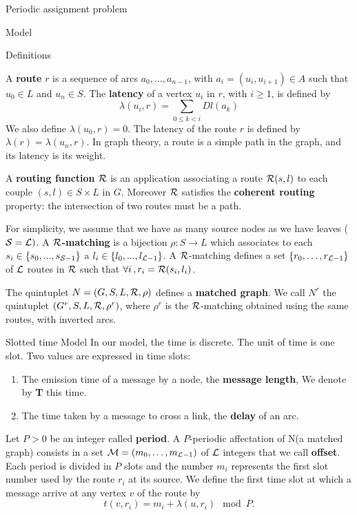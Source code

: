 \documentclass[a4paper,10pt]{report}
\newcommand\rmatching{${\cal R}$-matching\xspace}
\newcommand\matchedgraph{{\bf matched graph}}
\begin{document}
\begin{chapter}{Periodic assignment problem}
\begin{section}{Model}
\begin{subsection}{Definitions}
\begin{center}
{{}}\end{center}

A {\bf route} $r$ is a sequence of arcs $a_0, \ldots , a_{n-1}$, with $a_i=(u_i,u_{i+1}) \in A$ such that $u_0 \in L$ and $u_n \in S$.
The {\bf latency} of a vertex $u_i$ in $r$, with $i \geq 1$, is defined by $$\lambda(u_i,r)= \sum\limits_{0 \leq k <i} Dl(a_k)$$ We also define $\lambda(u_0,r)=0$.
The latency of the route $r$ is defined by $\lambda (r)= \lambda (u_n,r)$. In graph theory, a route is a simple path in the graph, and its latency is its weight. 


A {\bf routing function}  ${\cal R}$ is an application associating a route  ${\cal R}(s,l)$ to each couple $(s,l) \in S \times L$ in $G$.
Moreover ${\cal R}$ satisfies the {\bf coherent routing} property: the intersection of two routes must be a path.

For simplicity, we assume that we have as many source nodes as we have leaves (${\cal S} = {\cal L})$.
A {\bf ${\cal R}$-matching} is a bijection $\rho:S\rightarrow L$ which associates to each $s_i \in \{s_0,...,s_{{\cal S}-1}\}$ 
a $l_i \in \{l_0,...,l_{{\cal L}-1}\}$.
A \rmatching defines a set $\{r_0, \ldots ,r_{{\cal L}-1}\}$ of ${\cal L}$ routes in ${\cal R}$ such that $\forall i\,, r_i = {\cal R}(s_i,l_i)$.

The quintuplet $N=(G,S,L,{\cal R},\rho)$ defines a \matchedgraph. We call $N^r$ the quintuplet $(G^r,S,L,{\cal R},\rho^r)$, 
where $\rho^r$ is the \rmatching obtained using the same routes, with inverted arcs.

\end{subsection}
\begin{subsection}{Slotted time Model}
\label{slottedtime}
In our model, the time is discrete. The unit of time is one slot. Two values are expressed in time slots: 
\begin{enumerate}
 \item The emission time of a message by a node, the {\bf message length}, We denote by {\bf T} this time.
 \item The time taken by a message to cross a link, the {\bf delay} of an arc.
\end{enumerate}

Let $P>0$ be an integer called {\bf period}. 
A $P$-periodic affectation of N(a matched graph) consists in a set  ${\cal M}=(m_0, \ldots ,m_{{\cal L}-1})$
of ${\cal L}$ integers that we call {\bf offset}. 
Each period is divided in $P$ slots and the number $m_i$ represents the first slot number used by the route $r_i$ at its source.
We define the first time slot at which a message arrive at any vertex $v$ of the route by $$t(v,r_i) = m_i+\lambda(u,r_i) \mod P.$$


\end{subsection}
\end{section}
\end{chapter}
\end{document}
